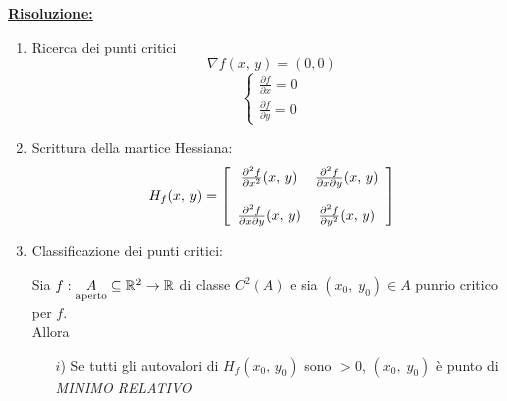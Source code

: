 \underline{\textbf{Risoluzione:}}
\begin{enumerate}
    \item Ricerca dei punti critici \\
    \[ \nabla f (x,\,y) = (0,0)  \]
    \[
        \begin{cases}
            \frac{\partial f}{\partial x}= 0\\
            \frac{\partial f}{\partial y}= 0
        \end{cases}
    \]

    \item Scrittura della martice Hessiana:
    \begin{equation}
        H_f(x, \, y) = \left[
            \begin{array}{c c}
                \frac{\partial^2 f}{\partial x^2}(x, \, y)  & \frac{\partial^2 f}{\partial x \partial y}(x, \, y) \\ \\
                \frac{\partial^2 f}{\partial x \partial y}(x, \, y) & \frac{\partial^2 f}{\partial y^2}(x, \, y)
            \end{array}
        \right]
    \end{equation}

    \item Classificazione dei punti critici:
    \begin{theorem}
        Sia $f : \underset{\mbox{\scriptsize{aperto}}}{A} \subseteq \mathbb{R}^2 \to \mathbb{R}$ di classe $C^2 (A)$ e sia $(x_0, \; y_0) \in A$ punrio critico per $f$.\\
        Allora
        \begin{itemize}
            \item [$i$)] Se tutti gli autovalori di $H_f (x_0,\, y_0)$ sono $> 0$, $(x_0, \; y_0)$ è punto di \emph{MINIMO RELATIVO}
            \begin{center}
\end{center}
\end{itemize}
\end{theorem}
\end{enumerate}
